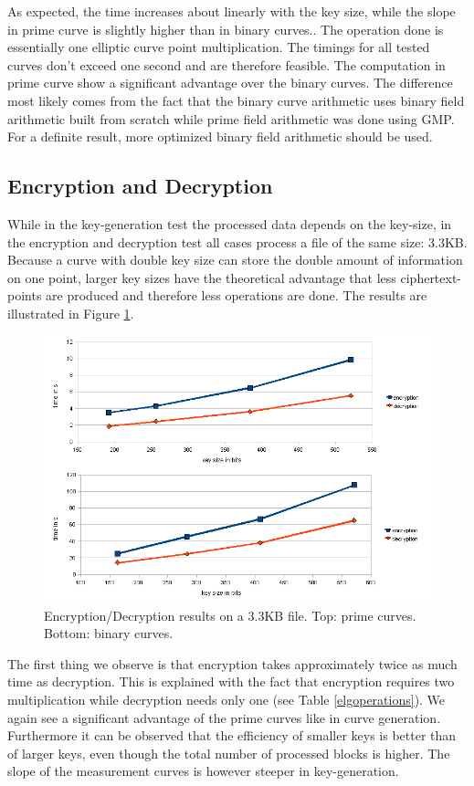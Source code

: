\documentclass[11pt,english]{article}
\begin{document}
As expected, the time increases about linearly with the key size, while the slope in prime curve is slightly higher than in binary curves.. The operation done is essentially one elliptic curve point multiplication. The timings for all tested curves don't exceed one second and are therefore feasible. The computation in prime curve show a significant advantage over the binary curves. The difference most likely comes from the fact that the binary curve arithmetic uses binary field arithmetic built from scratch while prime field arithmetic was done using GMP. For a definite result, more optimized binary field arithmetic should be used.

\subsection{Encryption and Decryption}
While in the key-generation test the processed data depends on the key-size, in the encryption and decryption test all cases process a file of the same size: 3.3KB. Because a curve with double key size can store the double amount of information on one point, larger key sizes have the theoretical advantage that less ciphertext-points are produced and therefore less operations are done. The results are illustrated in Figure \ref{figure:encdec}.

\label{encdecres}
\begin{figure}[h]
\centering
\includegraphics[scale=0.6]{dia2.png}
\caption{Encryption/Decryption results on a 3.3KB file. Top: prime curves. Bottom: binary curves.}
\label{figure:encdec}
\end{figure}

The first thing we observe is that encryption takes approximately twice as much time as decryption. This is explained with the fact that encryption requires two multiplication while decryption needs only one (see Table \ref{elgoperations}). We again see a significant advantage of the prime curves like in curve generation. Furthermore it can be observed that the efficiency of smaller keys is better than of larger keys, even though the total number of processed blocks is higher. The slope of the measurement curves is however steeper in key-generation.
\end{document}
